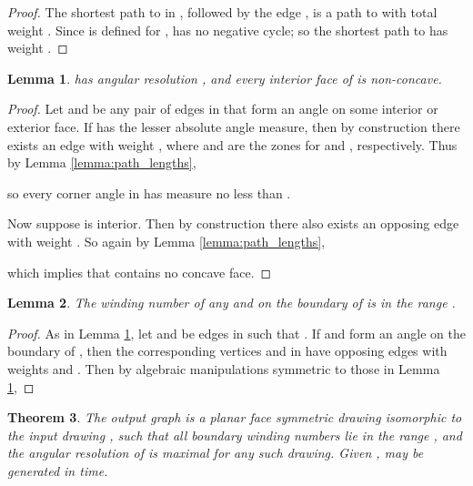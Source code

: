 \documentclass[11pt,letter]{article}
\newtheorem{theorem}{Theorem}[section]
\newtheorem{lemma}[theorem]{Lemma}
\begin{document}
\begin{proof}
The shortest path to  in , followed by the edge , is a path to  with total weight .  Since  is defined for ,   has no negative cycle; so the shortest path to  has weight .
\end{proof}

\begin{lemma}
\label{lemma:angles}
 has angular resolution , and every interior face of  is non-concave.
\end{lemma}

\begin{proof}
Let  and  be any pair of edges in  that form an angle on some interior or exterior face.  If  has the lesser absolute angle measure, then by construction there exists an edge  with weight , where  and  are the zones for  and , respectively.  Thus by Lemma \ref{lemma:path_lengths},

\noindent so every corner angle in  has measure no less than .

Now suppose  is interior.  Then by construction there also exists an opposing edge  with weight .  So again by Lemma \ref{lemma:path_lengths},

\noindent which implies that  contains no concave face.
\end{proof}

\begin{lemma}
\label{lemma:winding_numbers}
The winding number of any  and  on the boundary of  is in the range .
\end{lemma}

\begin{proof}
As in Lemma \ref{lemma:angles}, let  and  be edges in  such that .  If  and  form an angle on the boundary of , then the corresponding vertices  and  in  have opposing edges with weights  and .  Then by algebraic manipulations symmetric to those in Lemma \ref{lemma:angles},

\end{proof}

\begin{theorem}
The output graph  is a planar face symmetric drawing isomorphic to the input drawing , such that all boundary winding numbers lie in the range , and the angular resolution of  is maximal for any such drawing.  Given ,  may be generated in  time.
\end{theorem}
\end{document}
